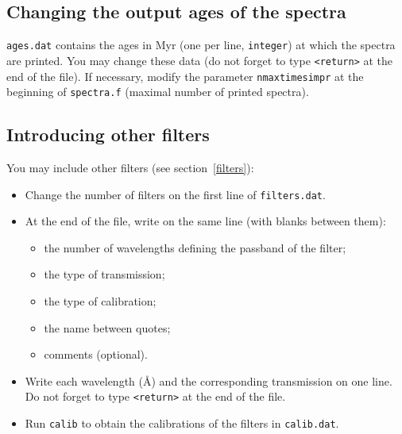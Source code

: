 \documentclass[11pt,draft,fleqn]{article}
\begin{document}
\subsection{Changing the output ages of the spectra}
\texttt{ages.dat} contains the ages in Myr (one per line, \texttt{integer}) at which the spectra are 
printed.
You may change these data (do not forget to type \texttt{<return>} at the
end of the file). If necessary, modify the parameter 
\texttt{nmaxtimesimpr} at the beginning of \texttt{spectra.f} (maximal number of
printed spectra).
\subsection{Introducing other filters}
You may include other filters (see section~\ref{filters}):
\begin{itemize}
\item Change the number of filters on the first line of \texttt{filters.dat}.
\item At the end of the file, write on the same line (with blanks
between them):
\begin{itemize}
\item the number of wavelengths defining the 
passband of the filter;
\item the type of transmission;
\item the type of calibration;
\item the name between quotes;
\item comments (optional).
\end{itemize}
\item Write each wavelength (\AA) and the corresponding transmission on one 
line.
Do not forget to type \texttt{<return>} at the end of the file.
\item Run \texttt{calib} to obtain the calibrations of the filters in 
\texttt{calib.dat}.
\end{itemize}
\end{document}
